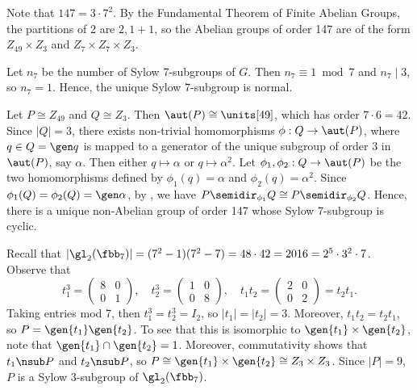 \begin{solenum}[spsol]
    \item Note that $147 = 3 \cdot 7^2$.
	By the Fundamental Theorem of Finite Abelian Groups, the partitions of 2 are $2, 1 + 1$, so the Abelian groups of order 147 are of the form $Z_{49} \times Z_3$ and $Z_7 \times Z_7 \times Z_3$.
    \item Let $n_7$ be the number of Sylow 7-subgroups of $G$.
	Then $n_7 \equiv 1 \bmod 7$ and $n_7 \mid 3$, so $n_7 = 1$.
	Hence, the unique Sylow 7-subgroup is normal.
    \item Let $P \cong Z_{49}$ and $Q \cong Z_3$.
	Then $\aut(P) \cong \units[49]$, which has order $7 \cdot 6 = 42$.
	Since $|Q| = 3$, there exists non-trivial homomorphisms $\phi : Q \to \aut(P)$, where $q \in Q = \gen q$ is mapped to a generator of the unique subgroup of order 3 in $\aut(P)$, say $\alpha$.
	Then either $q \mapsto \alpha$ or $q \mapsto \alpha^2$.
	Let $\phi_1, \phi_2 : Q \to \aut(P)$ be the two homomorphisms defined by $\phi_1(q) = \alpha$ and $\phi_2(q) = \alpha^2$.
	Since $\phi_1(Q) = \phi_2(Q) = \gen\alpha$, by , we have $P \semidir_{\phi_1} Q \cong P \semidir_{\phi_2} Q$.
	Hence, there is a unique non-Abelian group of order 147 whose Sylow 7-subgroup is cyclic.
    \item Recall that $|\gl_2(\fbb_7)| = (7^2 - 1)(7^2 - 7) = 48 \cdot 42 = 2016 = 2^5 \cdot 3^2 \cdot 7$.
	Observe that
    \[
    	t_1^3 = 
        \begin{pmatrix}
            8 & 0 \\
            0 & 1
        \end{pmatrix}, \quad 
        t_2^3 = 
        \begin{pmatrix}
            1 & 0 \\
            0 & 8
        \end{pmatrix}, \quad
        t_1t_2 = 
        \begin{pmatrix}
            2 & 0 \\
            0 & 2
        \end{pmatrix} = t_2t_1.
	\]
    Taking entries mod 7, then $t_1^3 = t_2^3 = I_2$, so $|t_1| = |t_2| = 3$.
	Moreover, $t_1t_2 = t_2t_1$, so $P = \gen{t_1}\gen{t_2}$.
	To see that this is isomorphic to $\gen{t_1} \times \gen{t_2}$, note that $\gen{t_1} \cap \gen{t_2} = 1$.
	Moreover, commutativity shows that ${t_1} \nsub P$ and ${t_2} \nsub P$, so $P \cong \gen{t_1} \times \gen{t_2} \cong Z_3 \times Z_3$.
	Since $|P| = 9$, $P$ is a Sylow 3-subgroup of $\gl_2(\fbb_7)$.


\end{solenum}
